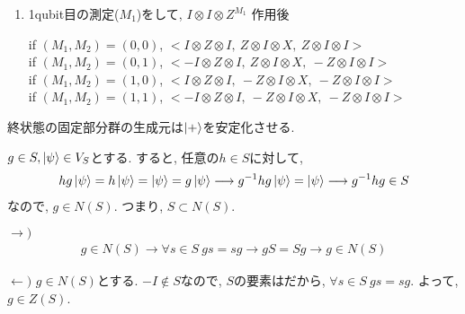 \begin{ex}
\begin{enumerate}
        \item 1qubit目の測定($M_1$)をして, $I \otimes I \otimes Z^{M_1}$ 作用後\par
              if $(M_1, M_2) = (0,0)$,  $< I \otimes Z \otimes I,\ Z \otimes I \otimes X,\ Z \otimes I \otimes I>$ \\
              if $(M_1, M_2) = (0,1)$,  $< -I \otimes Z \otimes I,\ Z \otimes I \otimes X,\ -Z \otimes I \otimes I>$ \\
              if $(M_1, M_2) = (1,0)$,  $< I \otimes Z \otimes I,\ - Z \otimes I \otimes X,\ - Z \otimes I \otimes I>$ \\
              if $(M_1, M_2) = (1,1)$,  $< -I \otimes Z \otimes I,\ -Z \otimes I \otimes X,\ - Z \otimes I \otimes I>$ \\
    \end{enumerate}
    終状態の固定部分群の生成元は$\ket{+}$を安定化させる. 
\end{ex}

\begin{ex}
    \label{ex10.43}
    $g \in S, \ket{\psi} \in V_S$とする. すると, 任意の$h \in S$に対して, 
    \begin{align*}
        h g \ket{\psi} = h \ket{\psi} = \ket{\psi} = g \ket{\psi}
        \longrightarrow
        g^{-1} h g \ket{\psi} = \ket{\psi}
        \longrightarrow
        g^{-1} h g \in S
    \end{align*}
    なので, $g \in N(S)$. つまり, $S \subset N(S)$.
\end{ex}

\begin{ex}
    \label{ex10.44}
    $\longrightarrow)$
    \begin{align*}
        g \in N(S) \longrightarrow \forall s \in S \ gs = sg \longrightarrow gS = Sg \longrightarrow g \in N(S)
    \end{align*}
    \par
    $\longleftarrow)$
    $g \in N(S)$とする. $-I \notin S$なので, $S$の要素はだから, $\forall s \in S \ gs = sg$. よって, $g \in Z(S)$.

\end{ex}

\begin{ex}
    \label{ex10.45}
    
\end{ex}


